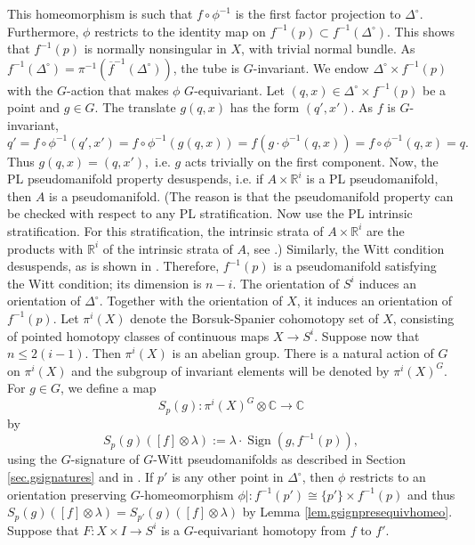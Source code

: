 \documentclass{amsart}
\theoremstyle{definition}
\theoremstyle{remark}
\newcommand {\real}  {\ensuremath{\mathbb{R}}}
\newcommand {\cplx}  {\ensuremath{\mathbb{C}}}
\newcommand {\Sign}    {{\ensuremath{\operatorname{Sign}}}}
\begin{document}
This homeomorphism is such that $f\circ \phi^{-1}$ is
the first factor projection to $\Delta^\circ$.
Furthermore, $\phi$ restricts to the identity map on 
$f^{-1} (p) \subset f^{-1} (\Delta^\circ)$.
This shows that $f^{-1} (p)$ is normally nonsingular in $X$, with 
trivial normal bundle.
As $f^{-1} (\Delta^\circ) = \pi^{-1} (\overline{f}^{-1} (\Delta^\circ))$, the tube is 
$G$-invariant.
We endow $\Delta^\circ \times f^{-1} (p)$ with the $G$-action
that makes $\phi$ $G$-equivariant.
Let $(q,x) \in \Delta^\circ \times f^{-1} (p)$ be a point and $g\in G$.
The translate $g(q,x)$ has the form $(q',x')$.
As $f$ is $G$-invariant,
\[ q' = f \circ \phi^{-1} (q',x') = f \circ \phi^{-1} (g (q,x)) 
    =  f(g\cdot \phi^{-1} (q,x))
    = f \circ \phi^{-1} (q,x) =q. \]
Thus $g(q,x) = (q,x'),$ i.e. $g$ acts trivially on the first component.
Now, the PL pseudomanifold property desuspends, i.e. if
$A\times \real^i$ is a PL pseudomanifold, then $A$ is a pseudomanifold.
(The reason is that the pseudomanifold property can be checked with respect
to any PL stratification. Now use the PL intrinsic stratification. For this
stratification, the intrinsic strata of $A\times \real^i$ are the products
with $\real^i$ of the intrinsic strata of $A$, see \cite[Prop. A.1]{blm}.)
Similarly, the Witt condition desuspends, as is shown in
\cite[p. 46, Lemma 14.1]{banaglborelequivlclass}.
Therefore, $f^{-1} (p)$ is a pseudomanifold satisfying the Witt condition;
its dimension is $n-i$.
The orientation of $S^i$ induces an orientation of $\Delta^\circ$.
Together with the orientation of $X$, it induces an orientation of
$f^{-1} (p)$.
Let $\pi^i (X)$ denote the Borsuk-Spanier cohomotopy set of $X$, consisting of
pointed homotopy classes of continuous maps $X\to S^i$. 
Suppose now that $n \leq 2(i-1)$.
Then $\pi^i (X)$ is an abelian group. 
There is a natural action of $G$ on $\pi^i (X)$ and the subgroup
of invariant elements will be denoted by $\pi^i (X)^G$.
For $g\in G$, we define a map
\[ S_p (g): \pi^i (X)^G \otimes \cplx \to \cplx \]
by
\[ S_p (g)([f] \otimes \lambda) :=
    \lambda \cdot \Sign (g, f^{-1} (p)), \]
using the $G$-signature of $G$-Witt pseudomanifolds as
described in Section \ref{sec.gsignatures} and in
\cite{blp}.
If $p'$ is any other point in $\Delta^\circ$, then 
$\phi$ restricts to an orientation preserving $G$-homeomorphism
$\phi|: f^{-1} (p') \cong \{ p' \} \times f^{-1}(p)$ and thus
$S_p (g)([f] \otimes \lambda) = S_{p'} (g)([f] \otimes \lambda)$
by Lemma \ref{lem.gsignpresequivhomeo}.
Suppose that $F: X \times I \to S^i$ is a 
$G$-equivariant homotopy from $f$ to $f'$.
\end{document}
